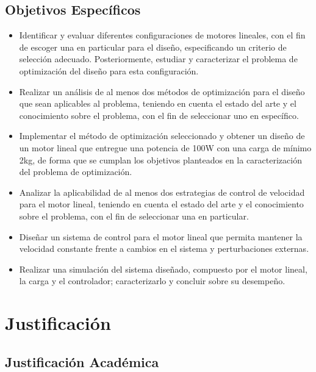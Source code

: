 \subsection{Objetivos Específicos}
\begin{itemize}
\item Identificar y evaluar diferentes configuraciones de motores lineales, con el fin de escoger una en particular para el diseño, especificando un criterio de selección adecuado. Posteriormente, estudiar y caracterizar el problema de optimización del diseño para esta configuración.

\item Realizar un análisis de al menos dos métodos de optimización para el diseño que sean aplicables al problema, teniendo en cuenta el estado del arte y el conocimiento sobre el problema, con el fin de seleccionar uno en específico.

\item Implementar el método de optimización seleccionado y obtener un diseño de un motor lineal que entregue una potencia de 100W con una carga de mínimo 2kg, de forma que se cumplan los objetivos planteados en la caracterización del problema de optimización.

\item Analizar la aplicabilidad de al menos dos estrategias de control de velocidad para el motor lineal, teniendo en cuenta el estado del arte y el conocimiento sobre el problema, con el fin de seleccionar una en particular.

\item Diseñar un sistema de control para el motor lineal que permita mantener la velocidad constante frente a cambios en el sistema y perturbaciones externas.

\item Realizar una simulación del sistema diseñado, compuesto por el motor lineal, la carga y el controlador; caracterizarlo y concluir sobre su desempeño.

\end{itemize}

\section{Justificación}

\subsection{Justificación Académica}

